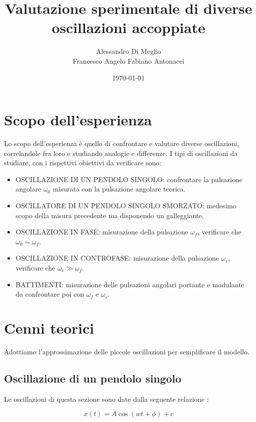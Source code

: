 \documentclass{article}
\title{Valutazione sperimentale di diverse oscillazioni accoppiate}
\author{Alessandro Di Meglio \\ Francesco Angelo Fabiano Antonacci}
\date{\today}
\begin{document}
\maketitle

\section{Scopo dell'esperienza} 

Lo scopo dell'esperienza è quello di confrontare e valutare diverse oscillazioni, correlandole fra loro e studiando analogie e differenze.
I tipi di oscillazioni da studiare, con i rispettivi obiettivi da verificare sono:

\begin{itemize}

	    \item OSCILLAZIONE DI UN PENDOLO SINGOLO: confrontare la pulsazione angolare $\omega_{0}$  misurata con la pulsazione angolare teorica.
	    \item OSCILLATORE DI UN PENDOLO SINGOLO SMORZATO: medesimo scopo della misura precedente ma disponendo un galleggiante.
	    \item OSCILLAZIONE IN FASE: misurazione della pulsazione $\omega_{f}$, verificare che $\omega_0 \sim \omega_f$.
	    \item OSCILLAZIONE IN CONTROFASE: misurazione della pulsazione $\omega_{c}$, verificare che $\omega_c \gg \omega_f$.
	    \item BATTIMENTI: misurazione delle pulsazioni angolari portante e modulante da confrontare poi con $\omega_{f}$ e $\omega_{c}$.
    
\end{itemize}

\section{Cenni teorici}

            Adottiamo l'approssimazione delle piccole oscillazioni per semplificare il modello.
            
		\subsection{ Oscillazione di un pendolo singolo}
  
            Le oscillazioni di questa sezione sono date dalla seguente relazione :


\begin{equation}
x(t) = A \cos(w t + \phi) + c
\label{eq:pene_singolo}
\end{equation}  
\end{document}
